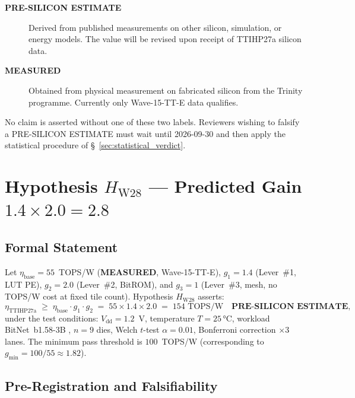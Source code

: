 \begin{description}
  \item[\textbf{PRE-SILICON ESTIMATE}]  Derived from published measurements on
    other silicon, simulation, or energy models.  The value will be revised upon
    receipt of TTIHP27a silicon data.
  \item[\textbf{MEASURED}]  Obtained from physical measurement on fabricated
    silicon from the Trinity programme.  Currently only Wave-15-TT-E data
    qualifies.
\end{description}

No claim is asserted without one of these two labels.  Reviewers wishing to
falsify a PRE-SILICON ESTIMATE must wait until 2026-09-30 and then apply the
statistical procedure of §~\ref{sec:statistical_verdict}.

\section{Hypothesis \texorpdfstring{$H_{\mathrm{W28}}$}{H\_W28} ---
  Predicted Gain \texorpdfstring{$1.4 \times 2.0 = 2.8$}{1.4×2.0=2.8}}
\label{sec:hypothesis}

\subsection{Formal Statement}

\begin{definition}
\label{def:h_w28}
Let \(\eta_{\mathrm{base}} = 55\)~TOPS/W (\textbf{MEASURED}, Wave-15-TT-E),
\(g_{1} = 1.4\) (Lever~\#1, LUT PE), \(g_{2} = 2.0\) (Lever~\#2, BitROM),
and \(g_{3} = 1\) (Lever~\#3, mesh, no TOPS/W cost at fixed tile count).
Hypothesis \(H_{\mathrm{W28}}\) asserts:
\[
  \eta_{\mathrm{TTIHP27a}} \;\geq\; \eta_{\mathrm{base}} \cdot g_{1} \cdot g_{2}
  \;=\; 55 \times 1.4 \times 2.0 \;=\; 154\text{ TOPS/W}
  \quad \textbf{PRE-SILICON ESTIMATE},
\]
under the test conditions: \(V_{\mathrm{dd}} = 1.2\)~V, temperature
\(T = 25\,\text{°C}\), workload BitNet~b1.58-3B \cite{bitnet_b158_2024},
\(n = 9\) dies, Welch \(t\)-test \(\alpha = 0.01\),
Bonferroni correction \(\times 3\) lanes.  The minimum pass threshold is
\(100\)~TOPS/W (corresponding to \(g_{\min} = 100/55 \approx 1.82\)).
\end{definition}

\subsection{Pre-Registration and Falsifiability}

